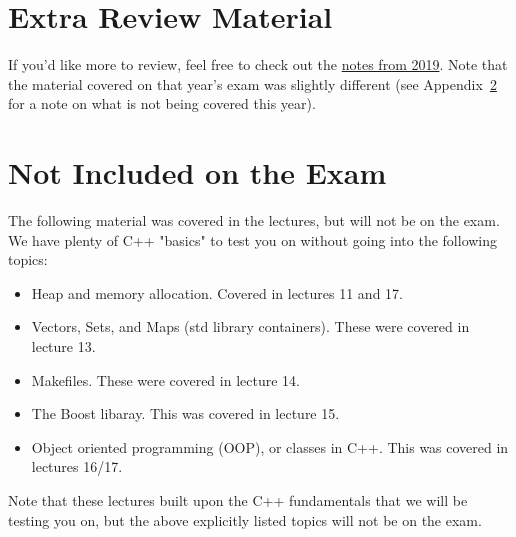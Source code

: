 \documentclass[12pt,letterpaper,twoside]{article}
\begin{document}
\newpage
\appendix
\section{Extra Review Material}
If you'd like more to review, feel free to check out the \href{https://github.com/CME211/notes/blob/master/exam-review/F2019_CME211_Cpp_Review.pdf}{notes from 2019}.  Note that the material covered on that year's exam was slightly different (see Appendix~\ref{app:not_incl} for a note on what is not being covered this year).

\section{Not Included on the Exam} \label{app:not_incl}

The following material was covered in the lectures, but will not be on the exam.  We have plenty of C++ "basics" to test you on without going into the following topics:
\begin{itemize}
  \item Heap and memory allocation.  Covered in lectures 11 and 17.
  \item Vectors, Sets, and Maps (std library containers).  These were covered in lecture 13.
  \item Makefiles.  These were covered in lecture 14.
  \item The Boost libaray.  This was covered in lecture 15.
  \item Object oriented programming (OOP), or classes in C++.  This was covered in lectures 16/17.
\end{itemize}
Note that these lectures built upon the C++ fundamentals that we will be testing you on, but the above explicitly listed topics will not be on the exam.  
\end{document}
